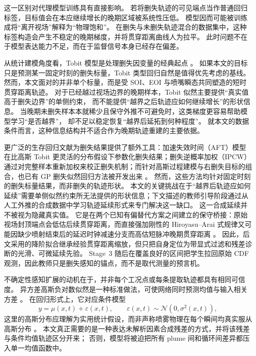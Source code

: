 这一区别对代理模型训练具有直接影响。
若将删失轨迹的可见端点当作普通回归标签，目标值会在本应继续增长的晚期区域被系统性压低。
模型因而可能被训练成将``离开视场''解释为``物理饱和''。
在删失与未删失轨迹混合的数据集中，这种标签构造会产生不稳定的晚期梯度，并将贯穿距离曲线人为拉平。
此时问题不在于模型表达能力不足，而在于监督信号本身已经存在偏差。

从统计建模角度看，Tobit 模型是处理删失因变量的经典起点 \cite{Tobin1958}。
如果本文的目标只是预测某一固定时刻的删失标量，Tobit 类型回归自然是值得优先考虑的基线。
然而，本文面对的并非单个标量，而是受 SOI、EOI 与喷嘴瞬态共同塑造的短时贯穿距离轨迹。
对于已经越过视场边界的晚期样本，Tobit 似然主要提供``真实值高于删失边界''的单侧约束，
而不能提供``越界之后轨迹应如何继续增长''的形状信息。
当晚期未删失样本本就稀少且保守外推不可避免时，这类梯度更容易帮助模型学习``是否越界''，
却不足以稳定恢复``越界后延拓到何种程度''。
就本文的数据条件而言，这种信息结构并不适合作为晚期轨迹重建的主要依据。

更广泛的生存回归文献为删失结果提供了额外工具：加速失效时间（AFT）模型在比高斯 Tobit 更灵活的分布假设下参数化删失结果；删失逆概率加权（IPCW）通过对完整样本重新加权来校正删失机制；而针对高斯过程建模与右删失目标的组合，也已有 GP 删失似然回归方法被开发出来 \cite{Groot2012CensoredGP}。
然而，这些方法均针对固定时刻的删失标量结果，而非删失的轨迹形状。
本文的关键挑战在于``越界后轨迹应如何延续''需要单侧似然约束所无法提供的形状信息；下文描述的教师引导阶段通过从人工外推的合成数据中学习轨迹延续形式来专门解决这一缺口。
这一合成延续并不被视为隐藏真实值。
它是在两个已知有偏替代方案之间建立的保守桥接：原始视场封顶端点会低估后续贯穿距离，而直接强加刚性的 Hiroyasu--Arai 式规律又可能因缺少喷射结束后的延迟时钟减速分支而高估短脉冲晚期贯穿距离 \cite{HiroyasuArai1990,ZhouLiLaiWei2019}。
因此，后文采用的降阶拟合继承经验贯穿距离缩放，但只把自身定位为带显式过滤和残差诊断的光滑、可微延续先验。
Stage~3 随后在覆盖良好的区间把学生拉回原始 CDF 观测，因此教师只是删失感知的锚点，而不是取代测量的预言机。

不确定性感知扩展的动机在于，并非每个工况点或每条提取轨迹都具有相同可信度。
异方差高斯负对数似然是一种标准做法，可使网络同时预测均值与输入相关方差 \cite{KendallGal2017}。
在回归形式上，它对应条件模型
\[
y=\mu(x,t)+\varepsilon(x,t),\qquad \varepsilon(x,t)\sim \mathcal{N}(0,\sigma^2(x,t)),
\]
这里的高斯分布应理解为实用统计假设，而非声称喷雾物理在每个瞬间均真实服从高斯分布 \cite{BishopPRML2006,KendallGal2017}。
本文真正需要的是一种表达未解析因素合成残差的方式，并将该残差与条件均值轨迹区分开来；
否则，模型将被迫把所有 plume 间和循环间差异都压入单一均值函数中。

